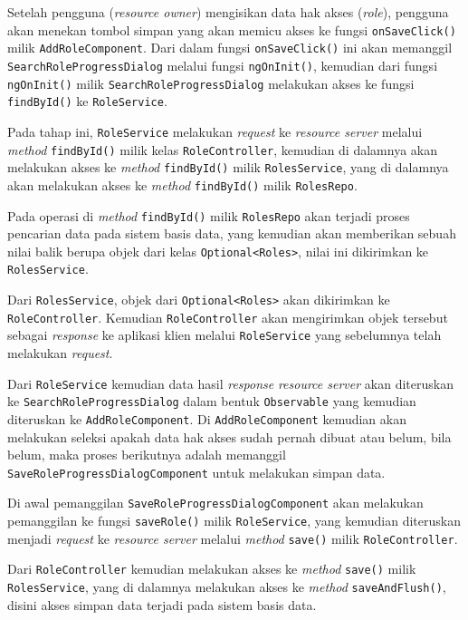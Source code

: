 \documentclass[pdftex,12pt, oneside]{article}
\begin{document}
\begin{itemize}
	Setelah pengguna (\textit{resource owner}) mengisikan data hak akses (\textit{role}), pengguna akan menekan tombol simpan yang akan memicu akses ke fungsi \texttt{onSaveClick()} milik \texttt{AddRoleComponent}. Dari dalam fungsi \texttt{onSaveClick()} ini akan memanggil \texttt{SearchRoleProgressDialog} melalui fungsi \texttt{ngOnInit()}, kemudian dari fungsi \texttt{ngOnInit()} milik \texttt{SearchRoleProgressDialog} melakukan akses ke fungsi \texttt{findById()} ke \texttt{RoleService}.
	
	Pada tahap ini, \texttt{RoleService} melakukan \textit{request} ke \textit{resource server} melalui \textit{method} \texttt{findById()} milik kelas \texttt{RoleController}, kemudian di dalamnya akan melakukan akses ke \textit{method} \texttt{findById()} milik \texttt{RolesService}, yang di dalamnya akan melakukan akses ke \textit{method} \texttt{findById()} milik \texttt{RolesRepo}.
	
	Pada operasi di \textit{method} \texttt{findById()} milik \texttt{RolesRepo} akan terjadi proses pencarian data pada sistem basis data, yang kemudian akan memberikan sebuah nilai balik berupa objek dari kelas \texttt{Optional<Roles>}, nilai ini dikirimkan ke \texttt{RolesService}.
	
	Dari \texttt{RolesService}, objek dari \texttt{Optional<Roles>} akan dikirimkan ke \texttt{RoleController}. Kemudian \texttt{RoleController} akan mengirimkan objek tersebut sebagai \textit{response} ke aplikasi klien melalui \texttt{RoleService} yang sebelumnya telah melakukan \textit{request}.
	
	Dari \texttt{RoleService} kemudian data hasil \textit{response} \textit{resource server} akan diteruskan ke \texttt{SearchRoleProgressDialog} dalam bentuk \texttt{Observable} yang kemudian diteruskan ke \texttt{AddRoleComponent}. Di \texttt{AddRoleComponent} kemudian akan melakukan seleksi apakah data hak akses sudah pernah dibuat atau belum, bila belum, maka proses berikutnya adalah memanggil \texttt{SaveRoleProgressDialogComponent} untuk melakukan simpan data.
	
	Di awal pemanggilan \texttt{SaveRoleProgressDialogComponent} akan melakukan pemanggilan ke fungsi \texttt{saveRole()} milik \texttt{RoleService}, yang kemudian diteruskan menjadi \textit{request} ke \textit{resource server} melalui \textit{method} \texttt{save()} milik \texttt{RoleController}.
	
	Dari \texttt{RoleController} kemudian melakukan akses ke \textit{method} \texttt{save()} milik \texttt{RolesService}, yang di dalamnya melakukan akses ke \textit{method} \texttt{saveAndFlush()}, disini akses simpan data terjadi pada sistem basis data.
	

\end{itemize}
\end{document}
